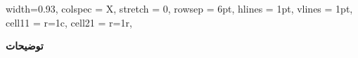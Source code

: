 \begin{table}[H]
	\label{Segment: 6}
	\begin{tblr}{
			width=0.93\textwidth,
			colspec = {X},
			stretch = 0,
			rowsep = 6pt,
			hlines = {1pt},
			vlines = {1pt},
			cell{1}{1} = {r=1}{c},
			cell{2}{1} = {r=1}{r},
		}
		
		\textbf{توضیحات}
		\\	
		\Details
		\\	
	\end{tblr}
\end{table}
